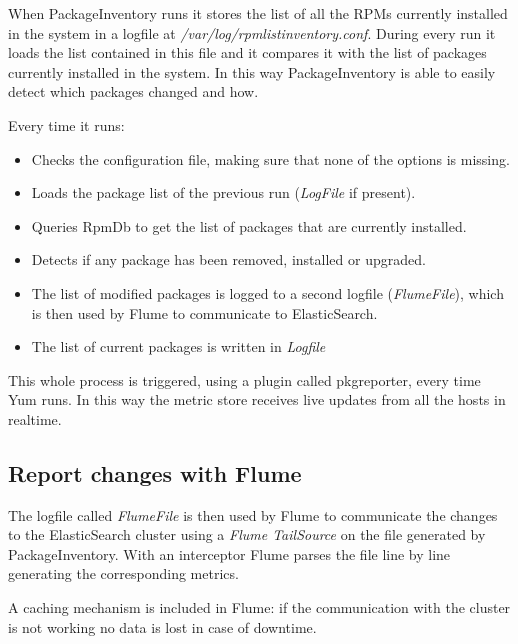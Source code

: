 When PackageInventory runs it stores the list of all the RPMs currently
installed in the system in a logfile at
\textit{/var/log/rpmlistinventory.conf}. During every run it loads the
list contained in this file and it compares it with the list of packages
currently installed in the system. In this way PackageInventory is able to
easily detect which packages changed and how.

Every time it runs:

\begin{itemize}
    \item Checks the configuration file, making sure that none of the options
            is missing.
    \item Loads the package list of the previous run (\textit{LogFile}
            if present).
    \item Queries RpmDb to get the list of packages that are currently
            installed.
    \item Detects if any package has been removed, installed or upgraded.
    \item The list of modified packages is logged to a second logfile
            (\textit{FlumeFile}), which is then used by Flume to communicate
            to ElasticSearch.
    \item The list of current packages is written in \textit{Logfile}
\end{itemize}

This whole process is triggered, using a plugin called pkgreporter, every
time Yum runs. In this way the metric store receives live updates from all
the hosts in realtime.

\subsection{Report changes with Flume}

The logfile called \textit{FlumeFile} is then used by Flume to communicate
the changes to the ElasticSearch cluster using a \textit{Flume TailSource}
on the file generated by PackageInventory. With an interceptor Flume
parses the file line by line generating the corresponding metrics.

A caching mechanism is included in Flume: if the communication with the
cluster is not working no data is lost in case of downtime.
